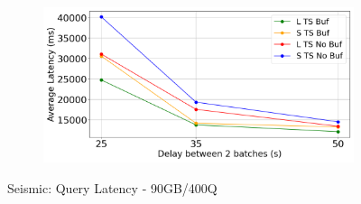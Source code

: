 \begin{figure}
	\centering
	\begin{subfigure}[c]{0.6\textwidth}
		\includegraphics[width=1\textwidth]   {figures/Experiments/Dynamic/SEISMIC/average_latency_SEISMIC.png}
	\end{subfigure}
	\caption{Seismic: Query Latency - 90GB/400Q}
	\label{fig:query-latency-seismic}
\end{figure}

